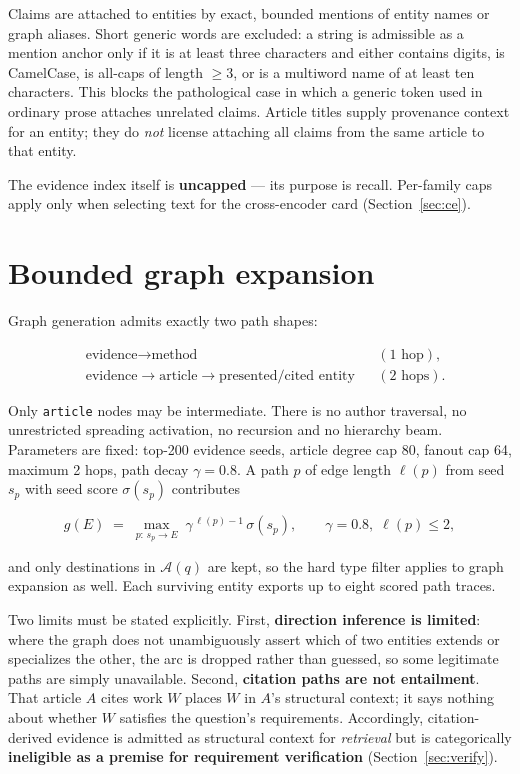 \documentclass[11pt,a4paper]{article}
\begin{document}
Claims are attached to entities by exact, bounded mentions of entity names or graph aliases. Short generic
words are excluded: a string is admissible as a mention anchor only if it is at least three characters and
either contains digits, is CamelCase, is all-caps of length $\ge 3$, or is a multiword name of at least ten
characters. This blocks the pathological case in which a generic token used in ordinary prose attaches
unrelated claims. Article titles supply provenance context for an entity; they do \emph{not} license
attaching all claims from the same article to that entity.

The evidence index itself is \textbf{uncapped} --- its purpose is recall. Per-family caps apply only when
selecting text for the cross-encoder card (Section~\ref{sec:ce}).

\section{Bounded graph expansion}

Graph generation admits exactly two path shapes:

\begin{align}
&\text{evidence} \longrightarrow \text{method} && (\text{1 hop}),\\
&\text{evidence} \longrightarrow \text{article} \longrightarrow \text{presented/cited entity} && (\text{2 hops}).
\end{align}

Only \texttt{article} nodes may be intermediate. There is no author traversal, no unrestricted spreading
activation, no recursion and no hierarchy beam. Parameters are fixed: top-200 evidence seeds, article degree
cap 80, fanout cap 64, maximum 2 hops, path decay $\gamma = 0.8$. A path $p$ of edge length $\ell(p)$ from
seed $s_p$ with seed score $\sigma(s_p)$ contributes

\begin{equation}
g(E) \;=\; \max_{p:\, s_p \longrightarrow E} \; \gamma^{\,\ell(p) - 1} \,\sigma(s_p),
\qquad \gamma = 0.8,\; \ell(p) \le 2,
\end{equation}

and only destinations in $\mathcal{A}(q)$ are kept, so the hard type filter applies to graph expansion as
well. Each surviving entity exports up to eight scored path traces.

Two limits must be stated explicitly. First, \textbf{direction inference is limited}: where the graph does
not unambiguously assert which of two entities extends or specializes the other, the arc is dropped rather
than guessed, so some legitimate paths are simply unavailable. Second, \textbf{citation paths are not
entailment}. That article $A$ cites work $W$ places $W$ in $A$'s structural context; it says nothing about
whether $W$ satisfies the question's requirements. Accordingly, citation-derived evidence is admitted as
structural context for \emph{retrieval} but is categorically \textbf{ineligible as a premise for requirement
verification} (Section~\ref{sec:verify}).
\end{document}
